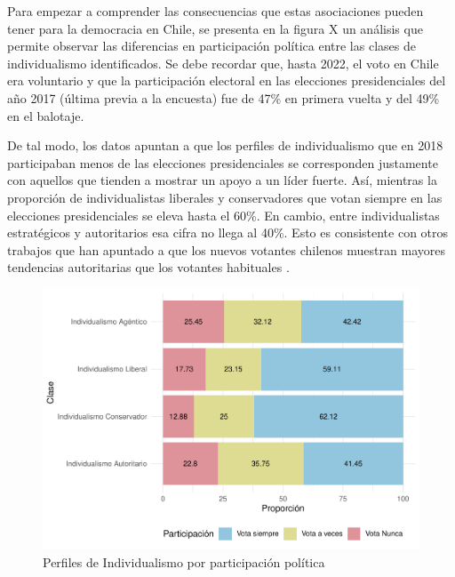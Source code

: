 \documentclass[12pt,twoside]{templates/facsothesis}
\begin{document}
\renewcommand*{\arraystretch}{1}

\FloatBarrier

Para empezar a comprender las consecuencias que estas asociaciones pueden tener para la democracia en Chile, se presenta en la figura X un análisis que permite observar las diferencias en participación política entre las clases de individualismo identificados. Se debe recordar que, hasta 2022, el voto en Chile era voluntario y que la participación electoral en las elecciones presidenciales del año 2017 (última previa a la encuesta) fue de 47\% en primera vuelta y del 49\% en el balotaje.

De tal modo, los datos apuntan a que los perfiles de individualismo que en 2018 participaban menos de las elecciones presidenciales se corresponden justamente con aquellos que tienden a mostrar un apoyo a un líder fuerte. Así, mientras la proporción de individualistas liberales y conservadores que votan siempre en las elecciones presidenciales se eleva hasta el 60\%. En cambio, entre individualistas estratégicos y autoritarios esa cifra no llega al 40\%. Esto es consistente con otros trabajos que han apuntado a que los nuevos votantes chilenos muestran mayores tendencias autoritarias que los votantes habituales \citep{coes2023}.

\begin{figure}[!ht]

{\centering \includegraphics[width=1\linewidth,]{tesis_files/figure-latex/unnamed-chunk-11-1} 

}

\caption{Perfiles de Individualismo por participación política}\label{fig:unnamed-chunk-11}
\end{figure}
\end{document}
